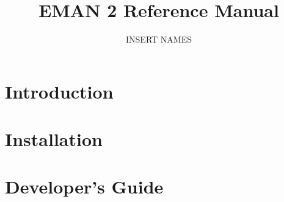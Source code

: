 \documentclass[a4paper,11pt]{report}
\title{EMAN 2 Reference Manual}
\author{INSERT NAMES}
\date{}
\begin{document}
  \maketitle

  \setcounter{tocdepth}{2}
  \tableofcontents

  \chapter{Introduction} 
    
    

  \chapter{Installation} \label{INSTALL} 
    

  \chapter{Developer's Guide} \label{DEVELOPERS-GUIDE} 
    
     
     
     
    
    
    
    
     \label{MISC-DEVELOPERS-GUIDE}
    

  \appendix



  \printindex
\end{document}
